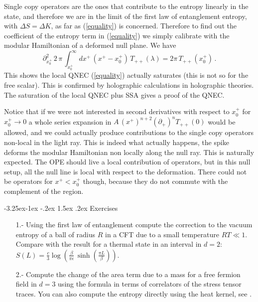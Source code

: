 \documentclass[11pt]{article}
\makeatletter
\renewcommand\subsection{\@startsection{subsection}{2}{\z@}%
                                   {-3.25ex\@plus -1ex \@minus -.2ex}%
                                     {1.5ex \@plus .2ex}%
                                     {\normalfont\bfseries}}
\numberwithin{equation}{section}
\newcommand{\be}{\begin{equation}}
\newcommand{\ee}{\end{equation}}
\makeatother
\begin{document}
Single copy operators are the ones that contribute to the entropy linearly in the state, and therefore we are in the limit of the first law of entanglement entropy, with $\Delta S=\Delta K$, as far as (\ref{equality}) is concerned. Therefore to find out the coefficient of the entropy term in (\ref{equality}) we simply calibrate with the modular Hamiltonian of a deformed null plane. We have
\be
\partial_{x_0^+}^2 \,2 \,\pi\,\int_{x_0^+}^\infty dx^+\, (x^+-x_0^+)\,T_{++}(\lambda)=2 \pi \, T_{++}(x_0^+)\,.
\ee
This shows the local QNEC (\ref{equality}) actually saturates (this is not so for the free scalar). 
This is confirmed by holographic calculations in holographic theories. The saturation of the local QNEC plus SSA gives a proof of the QNEC. 

Notice that if we were not interested in second derivatives with respect to $x^+_0$ for $x_0^+\rightarrow 0$ a whole series expansion in $A \,(x^+)^{n+2} (\partial_+)^n T_{++}(0)$ would be allowed, and we could actually produce contributions to the single copy operators non-local in the light ray. This is indeed what actually happens, the spike deforms the modular Hamiltonian non locally along the null ray. This is naturally expected. The OPE should live a local contribution of operators, but in this null setup, all the null line is local with respect to the deformation. There could not be operators for $x^+< x^+_0$ though, because they do not commute with the complement of the region.        

\subsection{Exercises}

\begin{itemize}

\item[1.-] Using the first law of entanglement compute the correction to the vacuum entropy of a ball of radius $R$ in a CFT due to a small temperature $R T\ll 1$. Compare with the result for a thermal state in an interval in $d=2$: $S(L)=\frac{c}{3} \log\left(\frac{\beta}{\pi\epsilon}\,\sinh\left(\frac{\pi L}{\beta}\right)\right)$.

\item[2.-] Compute the change of the area term due to a mass for a free fermion field in $d=3$ using the formula in terms of correlators of the stress tensor traces. You can also compute the entropy directly using the heat kernel, see \cite{Hertzberg:2010uv}. 

\end{itemize}
\end{document}
